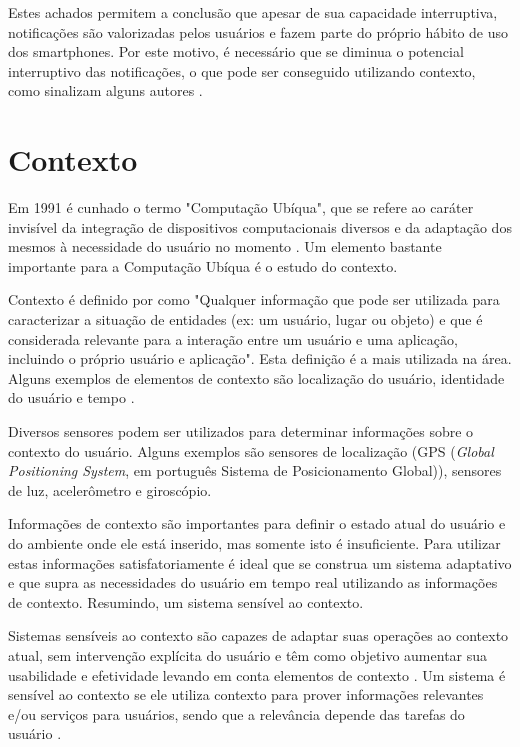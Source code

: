 Estes achados permitem a conclusão que apesar de sua capacidade interruptiva, notificações são valorizadas pelos
usuários e fazem parte do próprio hábito de uso dos smartphones. Por este motivo, é necessário que se diminua o potencial
interruptivo das notificações, o que pode ser conseguido utilizando contexto, como sinalizam alguns autores
\cite{ho2005using, kern2003context, iqbal2010notifications}.

\section{Contexto}
\label{contexto}

Em 1991 é cunhado o termo "Computação Ubíqua", que se refere ao caráter invisível da integração de dispositivos
computacionais diversos e da adaptação dos mesmos à necessidade do usuário no momento \cite{weiser1991computer}.
Um elemento bastante importante para a Computação Ubíqua é o estudo do contexto.

Contexto é definido por  como "Qualquer informação que pode ser utilizada para
caracterizar a situação de entidades (ex: um usuário, lugar ou objeto) e que é considerada relevante para
a interação entre um usuário e uma aplicação, incluindo o próprio usuário e aplicação". Esta definição é
a mais utilizada na área. Alguns exemplos de elementos de contexto são
localização do usuário, identidade do usuário e tempo \cite{ryan1999enhanced}.

Diversos sensores podem ser utilizados para determinar informações sobre o contexto do usuário. Alguns exemplos são
sensores de localização (GPS (\textit{Global Positioning System}, em português Sistema de Posicionamento Global)),
sensores de luz, acelerômetro e giroscópio.

Informações de contexto são importantes para definir o estado atual do usuário e do ambiente onde ele está inserido,
mas somente isto é insuficiente. Para utilizar estas informações satisfatoriamente é ideal que se construa um sistema
adaptativo e que supra as necessidades do usuário em tempo real utilizando as informações de contexto. Resumindo,
um sistema sensível ao contexto.

Sistemas sensíveis ao contexto são capazes de adaptar suas operações ao contexto atual, sem intervenção
explícita do usuário e têm como objetivo aumentar sua usabilidade e efetividade levando em conta elementos
de contexto \cite{baldauf2007survey}.  Um sistema é sensível ao contexto se ele utiliza contexto para prover
informações relevantes e/ou serviços para usuários, sendo que a relevância depende das tarefas do usuário
\cite{abowd1999towards}.

